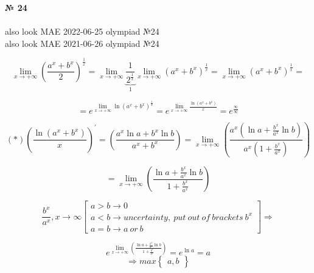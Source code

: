 \documentclass{article}
\begin{document}
\textbf{№ 24}
\\
\\ also look MAE 2022-06-25 olympiad №24 
\\ also look MAE 2021-06-26 olympiad №24

\Large

$$ \lim_{x\to+\infty} \left( {\frac{a^x+b^x}{2}}\right)^{\frac{1}{x}} 
= \lim_{x\to+\infty} \underbrace{\frac{1}{2^\frac{1}{x}}}_{1} \lim_{x\to+\infty}\left( {a^x+b^x}\right)^{\frac{1}{x}} 
= \lim_{x\to+\infty}\left( {a^x+b^x}\right)^{\frac{1}{x}}
= $$

$$ = e^{\lim\limits_{x \to+\infty}\ln\left( {a^x+b^x}\right)^{\frac{1}{x}}} 
= e^{\lim\limits_{x \to+\infty} \frac{\ln\left( {a^x+b^x}\right)}{x}} 
= e^{\frac{\infty}{\infty}} $$

$$ (*) \left(\frac{\ln\left( {a^x+b^x}\right)}{x}\right)^\prime 
=  \left( \frac{a^x\ln{a}+b^x\ln{b}}{a^x+b^x} \right) 
= \lim\limits_{x \to+\infty} \left( \frac{a^x(\ln{a}+\frac{b^x}{a^x}\ln{b})}{a^x(1+\frac{b^x}{a^x})} \right) $$

$$ = \lim\limits_{x \to+\infty} \left( \frac{\ln{a}+\frac{b^x}{a^x}\ln{b}}{1+\frac{b^x}{a^x}} \right) $$

$$ \frac{b^x}{a^x}, x\to\infty
\left[
\begin{array}{lll}
a>b \rightarrow 0 \\
a<b \rightarrow uncertainty, \ put \ out \ of \ brackets \ b^x \\
a=b \rightarrow a \ or \ b
\end{array}
\right] 
\Rightarrow$$

$$
e^{ \lim\limits_{x \to+\infty} \left( \frac{\ln{a}+\frac{b^x}{a^x}\ln{b}}{1+\frac{b^x}{a^x}} \right)}
= e^{\ln{a}}
= a $$
$$ \Rightarrow max\left\{
  \begin{array}{ccc} 
  a, b 
  \end{array}
\right\} $$
\end{document}
